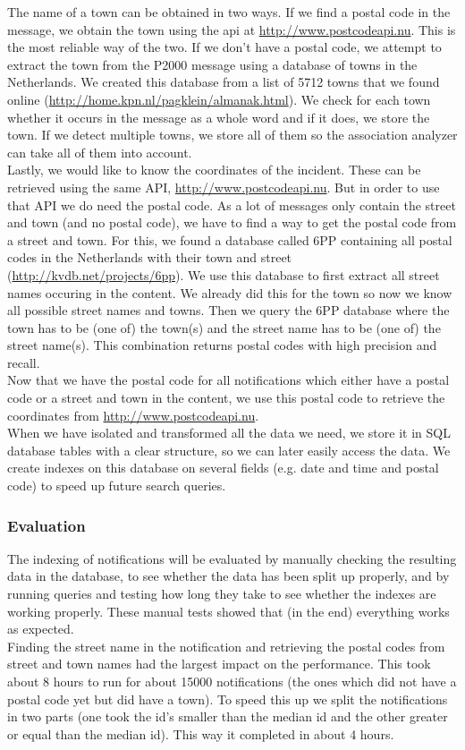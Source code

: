 The name of a town can be obtained in two ways. If we find a postal code in the message, we obtain the town using the api at \url{http://www.postcodeapi.nu}. This is the most reliable way of the two. If we don't have a postal code, we attempt to extract the town from the P2000 message using a database of towns in the Netherlands. We created this database from a list of 5712 towns that we found online (\url{http://home.kpn.nl/pagklein/almanak.html}). We check for each town whether it occurs in the message as a whole word and if it does, we store the town. If we detect multiple towns, we store all of them so the association analyzer can take all of them into account.\\

Lastly, we would like to know the coordinates of the incident. These can be retrieved using the same API, \url{http://www.postcodeapi.nu}. But in order to use that API we do need the postal code. As a lot of messages only contain the street and town (and no postal code), we have to find a way to get the postal code from a street and town. For this, we found a database called 6PP containing all postal codes in the Netherlands with their town and street (\url{http://kvdb.net/projects/6pp}). We use this database to first extract all street names occuring in the content. We already did this for the town so now we know all possible street names and towns. Then we query the 6PP database where the town has to be (one of) the town(s) and the street name has to be (one of) the street name(s). This combination returns postal codes with high precision and recall.\\

Now that we have the postal code for all notifications which either have a postal code or a street and town in the content, we use this postal code to retrieve the coordinates from \url{http://www.postcodeapi.nu}.\\

When we have isolated and transformed all the data we need, we store it in SQL database tables with a clear structure, so we can later easily access the data. We create indexes on this database on several fields (e.g. date and time and postal code) to speed up future search queries.
\subsubsection*{Evaluation}
The indexing of notifications will be evaluated by manually checking the resulting data in the database, to see whether the data has been split up properly, and by running queries and testing how long they take to see whether the indexes are working properly. These manual tests showed that (in the end) everything works as expected.\\

Finding the street name in the notification and retrieving the postal codes from street and town names had the largest impact on the performance. This took about 8 hours to run for about 15000 notifications (the ones which did not have a postal code yet but did have a town). To speed this up we split the notifications in two parts (one took the id's smaller than the median id and the other greater or equal than the median id). This way it completed in about 4 hours.